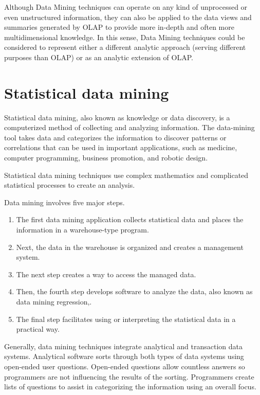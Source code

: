 \documentclass[11pt]{article} %
\begin{document}
Although Data Mining techniques can operate on any kind of unprocessed or even unstructured information, they can also be applied to the data views and summaries generated by OLAP to provide more in-depth and often more multidimensional knowledge. In this sense, Data Mining techniques could be considered to represent either a different analytic approach (serving different purposes than OLAP) or as an analytic extension of OLAP.




\section{Statistical data mining}


Statistical data mining, also known as knowledge or data discovery, is a computerized method of collecting and analyzing information. The data-mining tool takes data and categorizes the information to discover patterns or correlations that can be used in important applications, such as medicine, computer programming, business promotion, and robotic design. 


Statistical data mining techniques use complex mathematics and complicated statistical processes to create an analysis.


Data mining involves five major steps. 

\begin{enumerate}
\item The first data mining application collects statistical data and places the information in a warehouse-type program. 

\item Next, the data in the warehouse is organized and creates a management system. 

\item The next step creates a way to access the managed data. 

\item Then, the fourth step develops software to analyze the data, also known as data mining regression,. 

\item The final step facilitates using or interpreting the statistical data in a practical way.
\end{enumerate}

Generally, data mining techniques integrate analytical and transaction data systems. Analytical software sorts through both types of data systems using open-ended user questions. Open-ended questions allow countless answers so programmers are not influencing the results of the sorting. Programmers create lists of questions to assist in categorizing the information using an overall focus.
\end{document}
